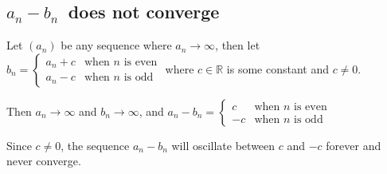 \documentclass[a4paper]{article}
\begin{document}
\subsection{$a_n - b_n$\normalfont\ does not converge}

Let $(a_n)$ be any sequence where $a_n \to \infty$, then let $b_n = \begin{cases}
    a_n + c &\text{when } n \text{ is even} \\[1ex]
    a_n - c &\text{when } n \text{ is odd}
\end{cases}$ where $c \in \mathbb R$ is some constant and $c \ne 0$.

Then $a_n \to \infty$ and $b_n \to \infty$, and $a_n - b_n = \begin{cases}
    c  &\text{when } n \text{ is even} \\[1ex]
    -c &\text{when } n \text{ is odd}
\end{cases}$

Since $c \ne 0$, the sequence $a_n - b_n$ will oscillate between $c$ and $-c$ forever and never converge.
\end{document}

